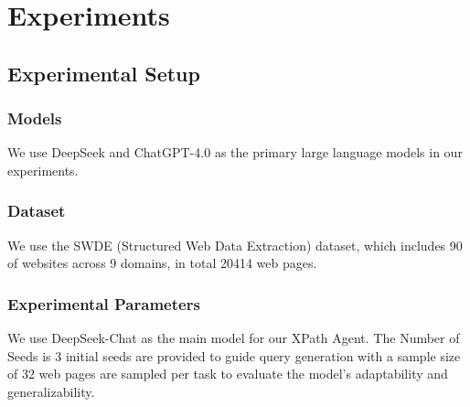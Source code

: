 \documentclass[a4paper]{article}
\begin{document}
\section{Experiments }

\subsection{Experimental Setup}

\subsubsection{Models}
We use DeepSeek and ChatGPT-4.0 as the primary large language models in our experiments.

\subsubsection{Dataset}
We use the SWDE\cite{abdin2024phi3technicalreporthighly} (Structured Web Data Extraction) dataset, which includes 90 of websites across 9 domains, in total 20414 web pages.

\subsubsection{Experimental Parameters}
We use DeepSeek-Chat as the main model for our XPath Agent. The Number of Seeds is 3 initial seeds are provided to guide query generation with a  
sample size of 32 web pages are sampled per task to evaluate the model’s adaptability and generalizability. 
\end{document}
